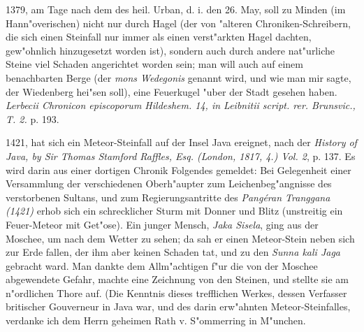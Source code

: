 \documentclass[a4paper, 11pt, oneside, polutonikogreek, german]{article}
\begin{document}
1379, am Tage nach dem des heil. Urban, d. i. den 26. May, soll zu Minden (im Hann"overischen) nicht nur durch Hagel (der von "alteren Chroniken-Schreibern, die sich einen Steinfall nur immer als einen verst"arkten Hagel dachten, gew"ohnlich hinzugesetzt worden ist), sondern auch durch andere nat"urliche Steine viel Schaden angerichtet worden sein; man will auch auf einem benachbarten Berge (der \emph{mons Wedegonis} genannt wird, und wie man mir sagte, der Wiedenberg hei"sen soll), eine Feuerkugel "uber der Stadt gesehen haben. \emph{Lerbecii Chronicon episcoporum Hildeshem. 14, in Leibnitii script. rer. Brunsvic., T. 2.} p. 193.

1421, hat sich ein Meteor-Steinfall auf der Insel Java ereignet, nach der \emph{History of Java, by Sir Thomas Stamford Raffles, Esq. (London, 1817, 4.) Vol. 2}, p. 137. Es wird darin aus einer dortigen Chronik Folgendes gemeldet: Bei Gelegenheit einer Versammlung der verschiedenen Oberh"aupter zum Leichenbeg"angnisse des verstorbenen Sultans, und zum Regierungsantritte des \emph{Pangéran Tranggana (1421)} erhob sich ein schrecklicher Sturm mit Donner und Blitz (unstreitig ein Feuer-Meteor mit Get"ose). Ein junger Mensch, \emph{Jaka Sisela}, ging aus der Moschee, um nach dem Wetter zu sehen; da sah er einen Meteor-Stein neben sich zur Erde fallen, der ihm aber keinen Schaden tat, und zu den \emph{Sunna kali Jaga} gebracht ward. Man dankte dem Allm"achtigen f"ur die von der Moschee abgewendete Gefahr, machte eine Zeichnung von den Steinen, und stellte sie am n"ordlichen Thore auf. (Die Kenntnis dieses trefflichen Werkes, dessen Verfasser britischer Gouverneur in Java war, und des darin erw"ahnten Meteor-Steinfalles, verdanke ich dem Herrn geheimen Rath v. S"ommerring in M"unchen.
\end{document}
